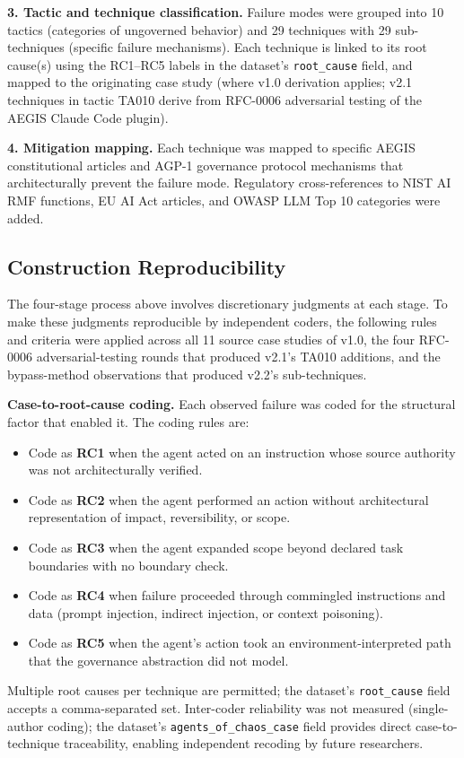 \documentclass{IEEEoj-data}
\newcommand{\replaced}[2]{#1}
\newcommand{\added}[1]{#1}
\newcommand{\deleted}[1]{}
\begin{document}
{\bf 3. Tactic and technique classification.} Failure modes were grouped into \replaced{10 tactics}{9 tactics} (categories of ungoverned behavior) and \replaced{29 techniques with 29 sub-techniques}{20 techniques} (specific failure mechanisms). \deleted{Each technique was assigned a severity rating (critical, high, medium, or low), linked} \added{Each technique is linked} to its root cause(s) using the \replaced{RC1--RC5}{RC1--RC4} labels in the dataset's \texttt{root\_cause} field, and mapped to the originating case study\added{ (where v1.0 derivation applies; v2.1 techniques in tactic TA010 derive from RFC-0006 adversarial testing of the AEGIS Claude Code plugin)}.

{\bf 4. Mitigation mapping.} Each technique was mapped to specific AEGIS constitutional articles and AGP-1 governance protocol mechanisms that architecturally prevent the failure mode. Regulatory cross-references to NIST AI RMF functions, EU AI Act articles, and OWASP LLM Top 10 categories were added.

\subsection*{\added{Construction Reproducibility}}

\added{The four-stage process above involves discretionary judgments at each stage. To make these judgments reproducible by independent coders, the following rules and criteria were applied across all 11 source case studies of v1.0, the four RFC-0006 adversarial-testing rounds that produced v2.1's TA010 additions, and the bypass-method observations that produced v2.2's sub-techniques.}

\added{{\bf Case-to-root-cause coding.} Each observed failure was coded for the structural factor that enabled it. The coding rules are:}
\begin{itemize}
\item \added{Code as {\bf RC1} when the agent acted on an instruction whose source authority was not architecturally verified.}
\item \added{Code as {\bf RC2} when the agent performed an action without architectural representation of impact, reversibility, or scope.}
\item \added{Code as {\bf RC3} when the agent expanded scope beyond declared task boundaries with no boundary check.}
\item \added{Code as {\bf RC4} when failure proceeded through commingled instructions and data (prompt injection, indirect injection, or context poisoning).}
\item \added{Code as {\bf RC5} when the agent's action took an environment-interpreted path that the governance abstraction did not model.}
\end{itemize}
\added{Multiple root causes per technique are permitted; the dataset's \texttt{root\_cause} field accepts a comma-separated set. Inter-coder reliability was not measured (single-author coding); the dataset's \texttt{agents\_of\_chaos\_case} field provides direct case-to-technique traceability, enabling independent recoding by future researchers.}
\end{document}
